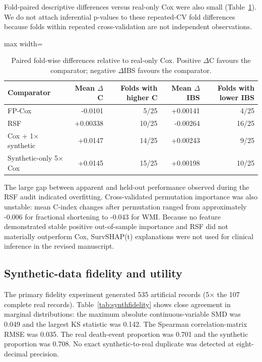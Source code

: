 \documentclass[a4paper,12pt]{article}
\begin{document}
Fold-paired descriptive differences versus real-only Cox were also small (Table~\ref{tab:paired}). We do not attach inferential p-values to these repeated-CV fold differences because folds within repeated cross-validation are not independent observations.

\begin{table}[H]
\centering
\caption{Paired fold-wise differences relative to real-only Cox. Positive $\Delta$C favours the comparator; negative $\Delta$IBS favours the comparator.}
\label{tab:paired}
\begin{adjustbox}{max width=\linewidth}
\begin{tabular}{lrrrr}
\toprule
Comparator & Mean $\Delta$C & Folds with higher C & Mean $\Delta$IBS & Folds with lower IBS \\
\midrule
FP-Cox & -0.0101 & 5/25 & +0.00141 & 4/25 \\
RSF & +0.00338 & 10/25 & -0.00264 & 16/25 \\
Cox + 1$\times$ synthetic & +0.0147 & 14/25 & +0.00243 & 9/25 \\
Synthetic-only 5$\times$ Cox & +0.0145 & 15/25 & +0.00198 & 10/25 \\
\bottomrule
\end{tabular}
\end{adjustbox}
\end{table}

The large gap between apparent and held-out performance observed during the RSF audit indicated overfitting. Cross-validated permutation importance was also unstable: mean C-index changes after permutation ranged from approximately -0.006 for fractional shortening to -0.043 for WMI. Because no feature demonstrated stable positive out-of-sample importance and RSF did not materially outperform Cox, SurvSHAP(t) explanations were not used for clinical inference in the revised manuscript.

\subsection{Synthetic-data fidelity and utility}
The primary fidelity experiment generated 535 artificial records (5$\times$ the 107 complete real records). Table~\ref{tab:synthfidelity} shows close agreement in marginal distributions: the maximum absolute continuous-variable SMD was 0.049 and the largest KS statistic was 0.142. The Spearman correlation-matrix RMSE was 0.035. The real death-event proportion was 0.701 and the synthetic proportion was 0.708. No exact synthetic-to-real duplicate was detected at eight-decimal precision.
\end{document}
